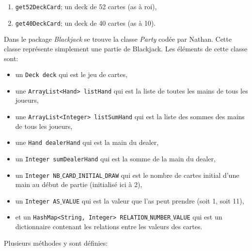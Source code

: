 \documentclass[french,12pt]{article}
\begin{document}
\begin{enumerate}
	\item \texttt{get52DeckCard}; un deck de 52 cartes (as à roi),
	\item \texttt{get40DeckCard}; un deck de 40 cartes (as à 10).\\
\end{enumerate}
Dans le package \textsl{Blackjack} se trouve la classe \textsl{Party} codée par Nathan. Cette classe représente simplement une partie de Blackjack. Les éléments de cette classe sont:
\begin{itemize}
	\item un \texttt{Deck deck} qui est le jeu de cartes,
	\item une \texttt{ArrayList<Hand> listHand} qui est la liste de toutes
		  les mains de tous les joueurs,
	\item une \texttt{ArrayList<Integer> listSumHand} qui est la liste des
		  sommes des mains de tous les joueurs,
	\item une \texttt{Hand dealerHand} qui est la main du dealer,
	\item un \texttt{Integer sumDealerHand} qui est la somme de la main du
		  dealer,
	\item un \texttt{Integer NB$\_$CARD$\_$INITIAL$\_$DRAW} qui est le
		  nombre de cartes initial d'une main au début de partie
		  (initialisé ici à 2),
	\item un \texttt{Integer AS$\_$VALUE} qui est la valeur que l'as peut
		  prendre (soit 1, soit 11),
	\item et un \texttt{HashMap<String, Integer> 
		  RELATION$\_$NUMBER$\_$VALUE} qui est un dictionnaire contenant
		  les relations entre les valeurs des cartes.\\
\end{itemize}
Plusieurs méthodes y sont définies:
\end{document}

